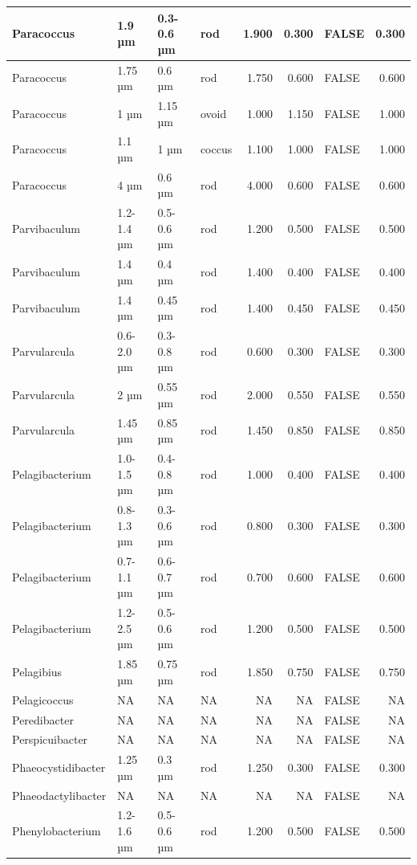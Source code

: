 \documentclass[
]{article}
\begin{document}
\begin{table}
\begin{tabular}{l|l|l|l|r|r|l|r}
\hline
Paracoccus & 1.9 µm & 0.3-0.6 µm & rod & 1.900 & 0.300 & FALSE & 0.300\\
\hline
Paracoccus & 1.75 µm & 0.6 µm & rod & 1.750 & 0.600 & FALSE & 0.600\\
\hline
Paracoccus & 1 µm & 1.15 µm & ovoid & 1.000 & 1.150 & FALSE & 1.000\\
\hline
Paracoccus & 1.1 µm & 1 µm & coccus & 1.100 & 1.000 & FALSE & 1.000\\
\hline
Paracoccus & 4 µm & 0.6 µm & rod & 4.000 & 0.600 & FALSE & 0.600\\
\hline
Parvibaculum & 1.2-1.4 µm & 0.5-0.6 µm & rod & 1.200 & 0.500 & FALSE & 0.500\\
\hline
Parvibaculum & 1.4 µm & 0.4 µm & rod & 1.400 & 0.400 & FALSE & 0.400\\
\hline
Parvibaculum & 1.4 µm & 0.45 µm & rod & 1.400 & 0.450 & FALSE & 0.450\\
\hline
Parvularcula & 0.6-2.0 µm & 0.3-0.8 µm & rod & 0.600 & 0.300 & FALSE & 0.300\\
\hline
Parvularcula & 2 µm & 0.55 µm & rod & 2.000 & 0.550 & FALSE & 0.550\\
\hline
Parvularcula & 1.45 µm & 0.85 µm & rod & 1.450 & 0.850 & FALSE & 0.850\\
\hline
Pelagibacterium & 1.0-1.5 µm & 0.4-0.8 µm & rod & 1.000 & 0.400 & FALSE & 0.400\\
\hline
Pelagibacterium & 0.8-1.3 µm & 0.3-0.6 µm & rod & 0.800 & 0.300 & FALSE & 0.300\\
\hline
Pelagibacterium & 0.7-1.1 µm & 0.6-0.7 µm & rod & 0.700 & 0.600 & FALSE & 0.600\\
\hline
Pelagibacterium & 1.2-2.5 µm & 0.5-0.6 µm & rod & 1.200 & 0.500 & FALSE & 0.500\\
\hline
Pelagibius & 1.85 µm & 0.75 µm & rod & 1.850 & 0.750 & FALSE & 0.750\\
\hline
Pelagicoccus & NA & NA & NA & NA & NA & FALSE & NA\\
\hline
Peredibacter & NA & NA & NA & NA & NA & FALSE & NA\\
\hline
Perspicuibacter & NA & NA & NA & NA & NA & FALSE & NA\\
\hline
Phaeocystidibacter & 1.25 µm & 0.3 µm & rod & 1.250 & 0.300 & FALSE & 0.300\\
\hline
Phaeodactylibacter & NA & NA & NA & NA & NA & FALSE & NA\\
\hline
Phenylobacterium & 1.2-1.6 µm & 0.5-0.6 µm & rod & 1.200 & 0.500 & FALSE & 0.500\\

\end{tabular}
\end{table}
\end{document}

